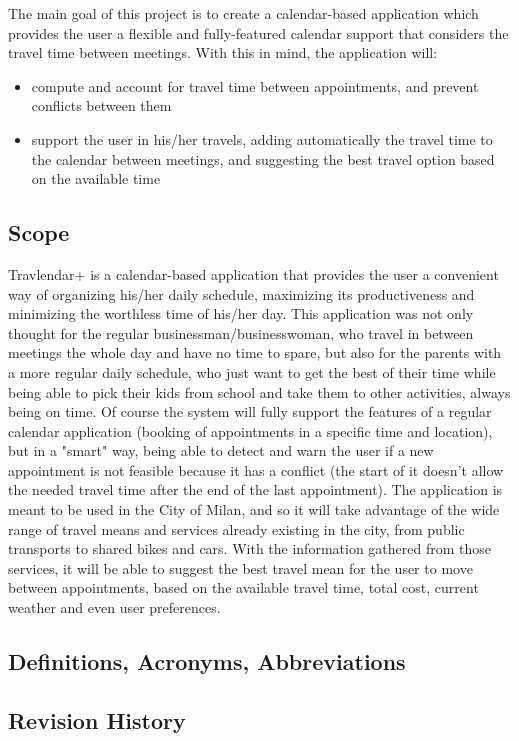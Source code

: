 \documentclass[12pt]{article}
\begin{document}
The main goal of this project is to create a calendar-based application which provides the user a flexible and fully-featured calendar support that considers the travel time between meetings. With this in mind, the application will:
\begin{itemize}
\item compute and account for travel time between appointments, and prevent conflicts between them
\item support the user in his/her travels, adding automatically the travel time to the calendar between meetings, and suggesting the best travel option based on the available time
\end{itemize}

\subsection{Scope}
Travlendar+ is a calendar-based application that provides the user a convenient way of organizing his/her daily schedule, maximizing its productiveness and minimizing the worthless time of his/her day. This application was not only thought for the regular businessman/businesswoman, who travel in between meetings the whole day and have no time to spare, but also for the parents with a more regular daily schedule, who just want to get the best of their time while being able to pick their kids from school and take them to other activities, always being on time.
Of course the system will fully support the features of a regular calendar application (booking of appointments in a specific time and location), but in a "smart" way, being able to detect and warn the user if a new appointment is not feasible because it has a conflict (the start of it doesn't allow the needed travel time after the end of the last appointment). The application is meant to be used in the City of Milan, and so it will take advantage of the wide range of travel means and services already existing in the city, from public transports to shared bikes and cars. With the information gathered from those services, it will be able to suggest the best travel mean for the user to move between appointments, based on the available travel time, total cost, current weather and even user preferences.


\subsection{Definitions, Acronyms, Abbreviations}

\subsection{Revision History}
\end{document}
